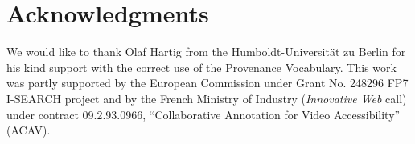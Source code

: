\documentclass{acm_proc_article-sp}
\begin{document}

\section*{Acknowledgments}                                                  \label{sec:acknowledgments}
We would like to thank Olaf Hartig from the Humboldt-Universit\"{a}t zu Berlin for his kind support with the correct
use of the Provenance Vocabulary. This work was partly supported by the European Commission under Grant No. 248296 FP7
I-SEARCH project and by the French Ministry of Industry (\emph{Innovative Web} call) under contract 09.2.93.0966,
``Collaborative Annotation for Video Accessibility'' (ACAV).





\appendix
\end{document}
